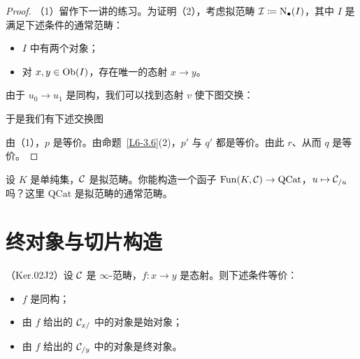 \begin{proof}
（1）留作下一讲的练习。为证明（2），考虑拟范畴 $\mathcal{I}\coloneqq\mathrm{N}_{\bullet}(I)$，其中 $I$ 是满足下述条件的通常范畴：
\begin{itemize}[leftmargin=2.2em,itemsep=0.1em]
\item $I$ 中有两个对象；
\item 对 $x,y\in\operatorname{Ob}(I)$，存在唯一的态射 $x\to y$。
\end{itemize}
由于 $u_0\to u_1$ 是同构，我们可以找到态射 $v$ 使下图交换：
\begin{center}
\end{center}
于是我们有下述交换图
\begin{center}
\end{center}
由（1），$p$ 是等价。由命题~\ref{L6-3.6}(2)，$p'$ 与 $q'$ 都是等价。由此 $r$、从而 $q$ 是等价。
\end{proof}

\begin{exercise}\label{L6-3.16}
设 $K$ 是单纯集，$\mathcal{C}$ 是拟范畴。你能构造一个函子 $\operatorname{Fun}(K,\mathcal{C})\to\mathrm{QCat}$，$u\mapsto\mathcal{C}_{/u}$ 吗？这里 $\mathrm{QCat}$ 是拟范畴的通常范畴。
\end{exercise}

\section{终对象与切片构造}

\begin{proposition}\label{L6-4.1}
（Ker.02J2）设 $\mathcal{C}$ 是 $\infty$-范畴，$f\colon x\to y$ 是态射。则下述条件等价：
\begin{itemize}[leftmargin=2.2em,itemsep=0.1em]
\item $f$ 是同构；
\item 由 $f$ 给出的 $\mathcal{C}_{x/}$ 中的对象是始对象；
\item 由 $f$ 给出的 $\mathcal{C}_{/y}$ 中的对象是终对象。
\end{itemize}
\end{proposition}

